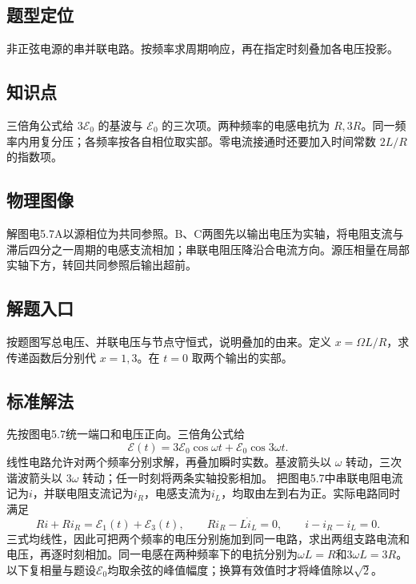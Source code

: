 \documentclass[UTF8,fontset=fandol,a4paper,11pt]{ctexart}
\begin{document}


\subsection*{题型定位}

非正弦电源的串并联电路。按频率求周期响应，再在指定时刻叠加各电压投影。



\subsection*{知识点}

三倍角公式给 $3\mathcal E_0$ 的基波与 $\mathcal E_0$ 的三次项。两种频率的电感电抗为 $R,3R$。同一频率内用复分压；各频率按各自相位取实部。零电流接通时还要加入时间常数 $2L/R$ 的指数项。



\subsection*{物理图像}

解图电5.7A以源相位为共同参照。B、C两图先以输出电压为实轴，将电阻支流与滞后四分之一周期的电感支流相加；串联电阻压降沿合电流方向。源压相量在局部实轴下方，转回共同参照后输出超前。



\subsection*{解题入口}

按题图写总电压、并联电压与节点守恒式，说明叠加的由来。定义 $x=\Omega L/R$，求传递函数后分别代 $x=1,3$。在 $t=0$ 取两个输出的实部。


\subsection*{标准解法}


先按图电5.7统一端口和电压正向。三倍角公式给
\[
 \mathcal E(t)=3\mathcal E_0\cos\omega t+\mathcal E_0\cos3\omega t.
\]
线性电路允许对两个频率分别求解，再叠加瞬时实数。基波箭头以 $\omega$ 转动，三次谐波箭头以 $3\omega$ 转动；任一时刻将两条实轴投影相加。
把图电5.7中串联电阻电流记为$i$，并联电阻支流记为$i_R$，电感支流为$i_L$，均取由左到右为正。实际电路同时满足
\[
Ri+Ri_R=\mathcal E_1(t)+\mathcal E_3(t),\qquad
Ri_R-L\dot i_L=0,\qquad i-i_R-i_L=0.
\]
三式均线性，因此可把两个频率的电压分别施加到同一电路，求出两组支路电流和电压，再逐时刻相加。同一电感在两种频率下的电抗分别为$\omega L=R$和$3\omega L=3R$。以下复相量与题设$\mathcal E_0$均取余弦的峰值幅度；换算有效值时才将峰值除以$\sqrt2$。
\end{document}
